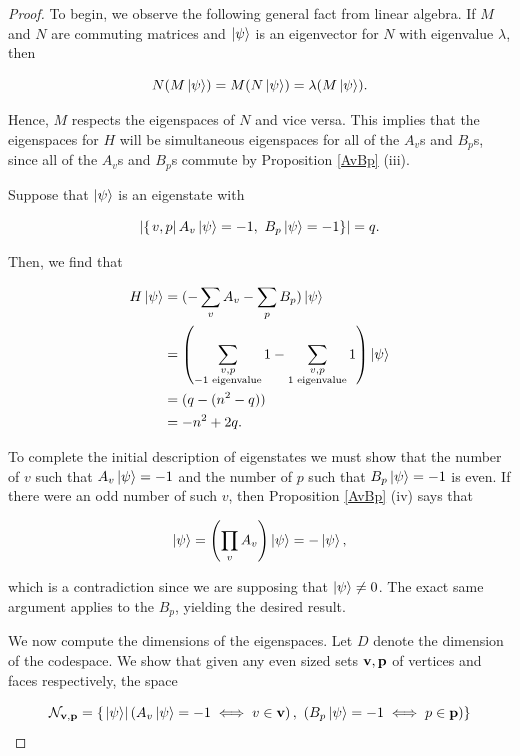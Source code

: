 \documentclass{article}
\theoremstyle{definition}
\numberwithin{figure}{section}
\begin{document}
\begin{proof} To begin, we observe the following general fact from linear algebra. If $M$ and $N$ are commuting matrices and $\left|\psi\right>$ is an eigenvector for $N$ with eigenvalue $\lambda$, then

$$N(M\left|\psi\right>)=M(N\left|\psi\right>)=\lambda (M\left|\psi\right>).$$

Hence, $M$ respects the eigenspaces of $N$ and vice versa. This implies that the eigenspaces for $H$ will be simultaneous eigenspaces for all of the $A_v$s and $B_p$s, since all of the $A_v$s and $B_p$s commute by Proposition \ref{AvBp} (iii).

Suppose that $\left|\psi\right>$ is an eigenstate with

$$\left|\left\{\left. v,p\right| A_v\left|\psi\right> =-1,\,\, B_p\left|\psi\right>=-1\right\}\right|=q.$$

Then, we find that

\begin{align*}
H\left|\psi\right>&=(-\sum_{v}A_v-\sum_{p}B_p)\left|\psi\right>\\
&=\left(\sum_{\substack{v,p \\ -1\text{ eigenvalue}}}1-\sum_{\substack{v,p \\ 1\text{ eigenvalue}}}1\right)\left|\psi\right>\\
&=(q-(n^2-q))\\
&=-n^2+2q.
\end{align*}

To complete the initial description of eigenstates we must show that the number of $v$ such that $A_v\left|\psi\right>=-1$ and the number of $p$ such that $B_p\left|\psi\right>=-1$ is even. If there were an odd number of such $v$, then Proposition \ref{AvBp} (iv) says that

$$\left|\psi\right> = \left(\prod_{v}A_v\right) \left|\psi\right> = -\left|\psi\right>,$$

which is a contradiction since we are supposing that $\left|\psi\right>\neq 0$. The exact same argument applies to the $B_p$, yielding the desired result.

We now compute the dimensions of the eigenspaces. Let $D$ denote the dimension of the codespace. We show that given any even sized sets $\bold{v}, \bold{p}$ of vertices and faces respectively, the space

$$\mathcal{N}_{\bold{v},\bold{p}}=\{\left.\left|\psi\right>\right| \left(A_v\left|\psi\right>=-1\iff v\in \bold{v}\right),\,\, \left(B_p\left|\psi\right>=-1\iff p\in\bold{p}\right) \}$$


\end{proof}
\end{document}
